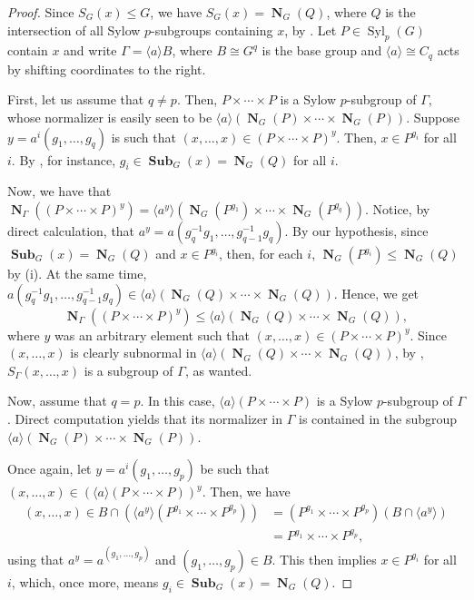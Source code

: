 \documentclass[12pt]{amsart}
\DeclareMathOperator{\NB}{\mathbf{N}}
\DeclareMathOperator{\Syl}{Syl}
\DeclareMathOperator{\Sub}{\mathbf{Sub}}
\theoremstyle{remark}
\theoremstyle{definition}
\theoremstyle{plain}
\theoremstyle{definition}
\numberwithin{equation}{section}
\begin{document}
\begin{proof}
	Since $S_G(x) \leq G$, we have $S_G(x) = \NB_G(Q)$, where $Q$ is the intersection of all Sylow $p$-subgroups containing $x$, by . Let $P \in \Syl_p(G)$ contain $x$ and write $\Gamma = \langle a \rangle B$, where $B \cong G^q$ is the base group and $\langle a \rangle \cong C_q$ acts by shifting coordinates to the right. 
	
	First, let us assume that $q \neq p$. Then, $P \times \cdots \times P$ is a Sylow $p$-subgroup of $\Gamma$, whose normalizer is easily seen to be $\langle a \rangle(\NB_G(P) \times \cdots \times \NB_G(P))$. Suppose $y = a^i(g_1, \ldots, g_q)$ is such that $(x, \ldots, x) \in (P \times \cdots \times P)^y$. Then, $x \in P^{g_i}$ for all $i$. By \cite[Lemma 2.9]{GunterSubnormalizer}, for instance, $g_i \in \Sub_G(x) = \NB_G(Q)$ for all $i$. 
	
	Now, we have that $\NB_\Gamma((P \times \cdots \times P)^y) = \langle a^y \rangle(\NB_G(P^{g_1}) \times \cdots \times \NB_G(P^{g_q}))$. Notice, by direct calculation, that $a^y = a(g_q^{-1}g_1, \ldots, g_{q-1}^{-1}g_q)$. By our hypothesis, since $\Sub_G(x) = \NB_G(Q)$ and $x \in P^{g_i}$, then, for each $i$, $\NB_G(P^{g_i}) \leq \NB_G(Q)$ by  (i). At the same time, $a(g_q^{-1}g_1, \ldots, g_{q-1}^{-1}g_q) \in \langle a \rangle (\NB_G(Q) \times \cdots \times \NB_G(Q))$. Hence, we get
	\begin{equation*}
		\NB_\Gamma((P \times \cdots \times P)^y) \leq \langle a \rangle (\NB_G(Q) \times \cdots \times \NB_G(Q)),
	\end{equation*}
	where $y$ was an arbitrary element such that $(x, \ldots, x) \in (P \times \cdots \times P)^y$. Since $(x, \ldots, x)$ is clearly subnormal in $\langle a \rangle (\NB_G(Q) \times \cdots \times \NB_G(Q))$, by \cite[Proposition 2.6]{GunterSubnormalizer}, $S_{\Gamma}(x, \ldots, x)$ is a subgroup of $\Gamma$, as wanted.
	
	Now, assume that $q = p$. In this case, $\langle a \rangle(P \times \cdots \times P)$ is a Sylow $p$-subgroup of $\Gamma$. Direct computation yields that its normalizer in $\Gamma$ is contained in the subgroup $\langle a \rangle(\NB_G(P) \times \cdots \times \NB_G(P))$.
	
	Once again, let $y = a^i (g_1, \ldots, g_p)$ be such that $(x, \ldots, x) \in (\langle a \rangle(P \times \cdots \times P))^y$. Then, we have 
	\begin{align*}
		(x, \ldots, x) \in B \cap (\langle a^y \rangle(P^{g_1} \times \cdots \times P^{g_p})) &= (P^{g_1} \times \cdots \times P^{g_p}) (B \cap \langle a^y \rangle) \\
		&= P^{g_1} \times \cdots \times P^{g_p},
	\end{align*}
	using that $a^y = a^{(g_1, \ldots, g_p)}$ and $(g_1, \ldots, g_p) \in B$. This then implies $x \in P^{g_i}$ for all $i$, which, once more, means $g_i \in \Sub_G(x) = \NB_G(Q)$. 
	

\end{proof}
\end{document}
